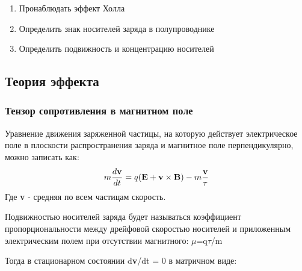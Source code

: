 \documentclass[a4paper, 12pt]{article}
\begin{document}
\begin{enumerate}
	\item Пронаблюдать эффект Холла 
	
	\item Определить знак носителей заряда в полупроводнике 
	
	\item Определить подвижность и концентрацию носителей
	
	
\end{enumerate}
\subsection{Теория эффекта}
\subsubsection{Тензор сопротивления в магнитном поле}
Уравнение движения заряженной частицы, на которую действует электрическое поле в плоскости распространения заряда и магнитное поле перпендикулярно, можно записать как:
\begin{equation}
	m\frac{d\textbf{v}}{dt}=q(\textbf{E}+\textbf{v}\times\textbf{B})-m\frac{\textbf{v}}{\tau} \\
\end{equation}
Где \textbf{v} - средняя по всем частицам скорость. 

Подвижностью носителей заряда будет называться коэффициент пропорциональности между дрейфовой скоростью носителей и приложенным электрическим полем при отсутствии магнитного: $\mu$=q$\tau$/m

Тогда в стационарном состоянии d\textbf{v}/dt = 0 в матричном виде:
\end{document}
